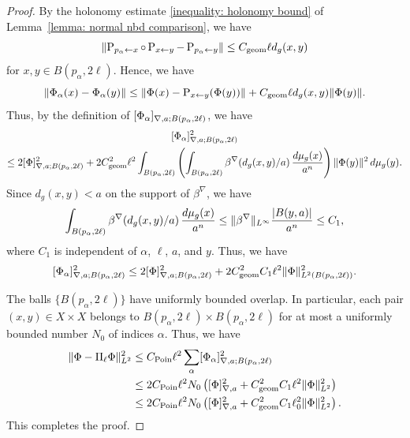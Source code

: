 \documentclass[a4paper,oneside,12pt]{amsart}
\theoremstyle{plain}
\theoremstyle{definition}
\theoremstyle{remark}
\DeclarePairedDelimiter{\abs}{\lvert}{\rvert}
\DeclarePairedDelimiter{\norm}{\lVert}{\rVert}
\DeclarePairedDelimiter{\seminorm}{\lbrack}{\rbrack}
\newcommand{\dvol}{d\mu}
\newcommand{\paralleltransport}[2]{\operatorname{P}_{#2 \gets #1}}
\newcommand{\Ltwonorm}[2][L^2]{\norm{#2}_{#1}}
\newcommand{\mesoscopicdifferenceseminorm}[2][a]{\seminorm{#2}_{\nabla,#1}}
\newcommand{\mesoscopicdifferenceseminormLocal}[3][a]{\seminorm{#3}_{\nabla,#1;#2}}
\newcommand{\cutoff}{\beta}
\newcommand{\cutoffnabla}{\cutoff^{\nabla}}
\newcommand{\constantgeometric}{C_{\mathrm{geom}}}
\newcommand{\constantPoincare}{C_{\mathrm{Poin}}}
\begin{document}
\begin{proof}
  By the holonomy estimate \eqref{inequality: holonomy bound} of Lemma~\ref{lemma: normal nbd comparison}, we have
  \begin{equation}
    \norm{\paralleltransport{x}{p_{\alpha}} \circ \paralleltransport{y}{x} - \paralleltransport{y}{p_{\alpha}}} \le \constantgeometric \ell d_g(x,y)
  \end{equation}
  for $x,y \in B(p_{\alpha},2\ell)$.
  Hence, we have
  \begin{equation}
    \norm{\Phi_{\alpha}(x) - \Phi_{\alpha}(y)} \le \norm{\Phi(x) - \paralleltransport{y}{x}(\Phi(y))} + \constantgeometric \ell d_g(x,y) \norm{\Phi(y)}.
  \end{equation}
  Thus, by the definition of $\mesoscopicdifferenceseminormLocal{B(p_{\alpha},2\ell)}{\Phi_{\alpha}}$, we have
  \begin{multline}
    \mesoscopicdifferenceseminormLocal{B(p_{\alpha},2\ell)}{\Phi_{\alpha}}^2 \\
    \le 2\mesoscopicdifferenceseminormLocal{B(p_{\alpha},2\ell)}{\Phi}^2+ 2\constantgeometric^2 \ell^2 \int_{B(p_{\alpha},2\ell)} \left(\int_{B(p_{\alpha},2\ell)} \cutoffnabla(d_g(x,y)/a) \,\frac{\dvol_g(x)}{a^n}\right) \norm{\Phi(y)}^2 \,\dvol_g(y).
  \end{multline}
  Since $d_g(x,y)<a$ on the support of $\cutoffnabla$, we have
  \begin{equation}
    \int_{B(p_{\alpha},2\ell)} \cutoffnabla(d_g(x,y)/a) \,\frac{\dvol_g(x)}{a^n} \le \norm{\cutoffnabla}_{L^{\infty}} \frac{\abs{B(y,a)}}{a^n} \le C_1,
  \end{equation}
  where $C_1$ is independent of $\alpha$, $\ell$, $a$, and $y$.
  Thus, we have
  \begin{equation}
    \mesoscopicdifferenceseminormLocal{B(p_{\alpha},2\ell)}{\Phi_{\alpha}}^2 \le2 \mesoscopicdifferenceseminormLocal{B(p_{\alpha},2\ell)}{\Phi}^2 +2 \constantgeometric^2 C_1 \ell^2 \Ltwonorm[L^2(B(p_{\alpha},2\ell))]{\Phi}^2.
  \end{equation}

  The balls $\{B(p_{\alpha},2\ell)\}$ have uniformly bounded overlap.
  In particular, each pair $(x,y) \in X \times X$ belongs to $B(p_{\alpha},2\ell) \times B(p_{\alpha},2\ell)$ for at most a uniformly bounded number $N_0$ of indices $\alpha$.
  Thus, we have
  \begin{equation}
    \begin{aligned}
    \Ltwonorm{\Phi - \Pi_{\ell}\Phi}^2 \le{}& \constantPoincare \ell^2 \sum_{\alpha} \mesoscopicdifferenceseminormLocal{B(p_{\alpha},2\ell)}{\Phi_{\alpha}}^2 \\
    \le{}& 2\constantPoincare \ell^2 N_0 \left( \mesoscopicdifferenceseminorm{\Phi}^2 + \constantgeometric^2 C_1 \ell^2 \Ltwonorm{\Phi}^2 \right) \\
    \le{}& 2\constantPoincare \ell^2 N_0 \left( \mesoscopicdifferenceseminorm{\Phi}^2 + \constantgeometric^2 C_1 \ell_0^2 \Ltwonorm{\Phi}^2 \right).
    \end{aligned}
  \end{equation}
  This completes the proof.
\end{proof}
\end{document}
